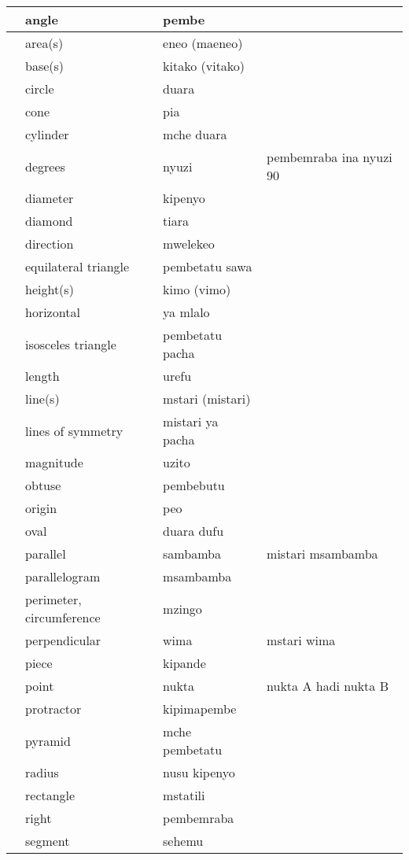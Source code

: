 \begin{center}
\begin{longtable}{|m{2cm}|m{4cm}|m{4cm}|m{4cm}|}
	&	angle	&	pembe	&		\\	\hline
	&	area(s)	&	eneo (maeneo)	&		\\	\hline
	&	base(s)	&	kitako (vitako)	&		\\	\hline
	&	circle	&	duara	&		\\	\hline
	&	cone	&	pia	&		\\	\hline
	&	cylinder	&	mche duara	&		\\	\hline
	&	degrees	&	nyuzi	&	pembemraba ina nyuzi 90	\\	\hline
	&	diameter	&	kipenyo	&		\\	\hline
	&	diamond	&	tiara	&		\\	\hline
	&	direction	&	mwelekeo	&		\\	\hline
	&	equilateral triangle	&	pembetatu sawa	&		\\	\hline
	&	height(s)	&	kimo (vimo)	&		\\	\hline
	&	horizontal	&	ya mlalo	&		\\	\hline
	&	isosceles triangle	&	pembetatu pacha	&		\\	\hline
	&	length	&	urefu	&		\\	\hline
	&	line(s)	&	mstari (mistari)	&		\\	\hline
	&	lines of symmetry	&	mistari ya pacha	&		\\	\hline
	&	magnitude	&	uzito	&		\\	\hline
	&	obtuse	&	pembebutu	&		\\	\hline
	&	origin	&	peo	&		\\	\hline
	&	oval	&	duara dufu	&		\\	\hline
	&	parallel	&	sambamba	&	mistari msambamba	\\	\hline
	&	parallelogram	&	msambamba	&		\\	\hline
	&	perimeter, circumference	&	mzingo	&		\\	\hline
	&	perpendicular	&	wima	&	mstari wima	\\	\hline
	&	piece	&	kipande	&		\\	\hline
	&	point	&	nukta	&	nukta A hadi nukta B	\\	\hline
	&	protractor	&	kipimapembe	&		\\	\hline
	&	pyramid	&	mche pembetatu	&		\\	\hline
	&	radius	&	nusu kipenyo	&		\\	\hline
	&	rectangle	&	mstatili	&		\\	\hline
	&	right	&	pembemraba	&		\\	\hline
	&	segment	&	sehemu	&		\\	\hline

\end{longtable}
\end{center}
